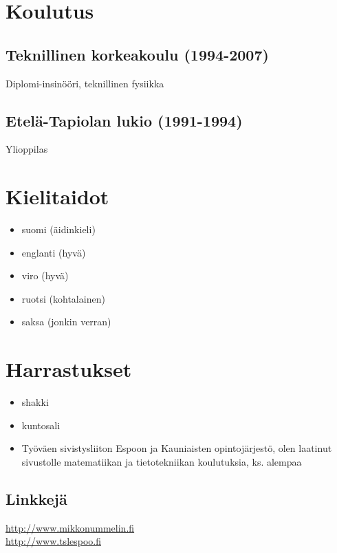 \documentclass[a4paper,12pt]{article}
\begin{document}
\section*{Koulutus}
\subsection*{Teknillinen korkeakoulu (1994-2007)}
Diplomi-insinööri, teknillinen fysiikka
\subsection*{Etelä-Tapiolan lukio (1991-1994)}
Ylioppilas
\section*{Kielitaidot}
\begin{itemize}
\item{suomi (äidinkieli)}
\item{englanti (hyvä)}
\item{viro (hyvä)}
\item{ruotsi (kohtalainen)}
\item{saksa (jonkin verran)}
\end{itemize}
\section*{Harrastukset}
\begin{itemize}
\item{shakki}
\item{kuntosali}
\item{Työväen sivistysliiton Espoon ja Kauniaisten opintojärjestö, olen laatinut sivustolle matematiikan ja tietotekniikan koulutuksia, ks. alempaa}
\end{itemize}
\subsection*{Linkkejä}
\href{http://www.mikkonummelin.fi}{http://www.mikkonummelin.fi} \\
\href{http://www.tslespoo.fi}{http://www.tslespoo.fi}
\end{document}
